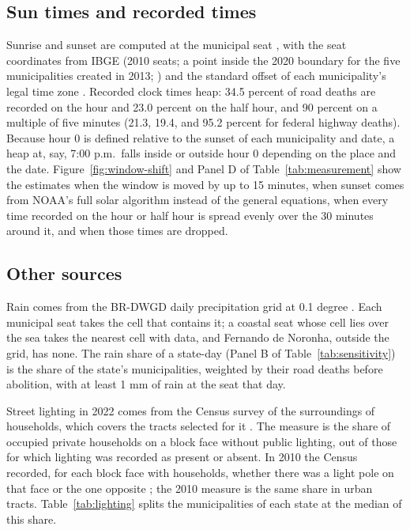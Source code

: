 \subsection{Sun times and recorded times}

Sunrise and sunset are computed at the municipal seat \citep{noaa2025solar}, with the seat coordinates from IBGE (2010 seats; a point inside the 2020 boundary for the five municipalities created in 2013; \citealp{ibge2010sedes, ibge2020municipios}) and the standard offset of each municipality's legal time zone \citep{brasil1913decreto, brasil2008lei, brasil2013lei}. Recorded clock times heap: 34.5 percent of road deaths are recorded on the hour and 23.0 percent on the half hour, and 90 percent on a multiple of five minutes (21.3, 19.4, and 95.2 percent for federal highway deaths). %
Because hour 0 is defined relative to the sunset of each municipality and date, a heap at, say, 7:00 p.m.\ falls inside or outside hour 0 depending on the place and the date. Figure~\ref{fig:window-shift} and Panel D of Table~\ref{tab:measurement} show the estimates when the window is moved by up to 15 minutes, when sunset comes from NOAA's full solar algorithm \citep{meeus1998astronomical} instead of the general equations, when every time recorded on the hour or half hour is spread evenly over the 30 minutes around it, and when those times are dropped.

\subsection{Other sources}\label{app:other}

Rain comes from the BR-DWGD daily precipitation grid at 0.1 degree \citep{xavier2022new}. Each municipal seat takes the cell that contains it; a coastal seat whose cell lies over the sea takes the nearest cell with data, and Fernando de Noronha, outside the grid, has none. The rain share of a state-day (Panel B of Table~\ref{tab:sensitivity}) is the share of the state's municipalities, weighted by their road deaths before abolition, with at least 1 mm of rain at the seat that day.

Street lighting in 2022 comes from the Census survey of the surroundings of households, which covers the tracts selected for it \citep{ibge2023censo}. The measure is the share of occupied private households on a block face without public lighting, out of those for which lighting was recorded as present or absent. In 2010 the Census recorded, for each block face with households, whether there was a light pole on that face or the one opposite \citep{ibge2011censo}; the 2010 measure is the same share in urban tracts. Table~\ref{tab:lighting} splits the municipalities of each state at the median of this share.

